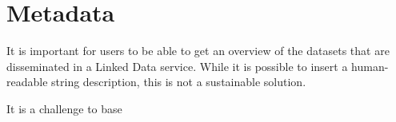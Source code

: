 \documentclass[a4paper]{scrartcl}
\begin{document}

\section{Metadata}
\label{sec:metadata}

It is important for users to be able to get an overview of the
datasets that are disseminated in a Linked Data service.  While it is
possible to insert a human-readable string description, this is not a
sustainable solution.

It is a challenge to base 
\end{document}
